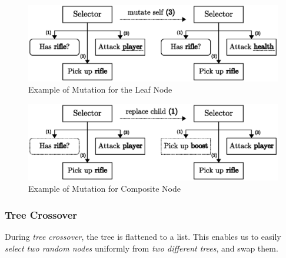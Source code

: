 \documentclass[a4paper, twocolumn]{article}
\begin{document}
        \begin{figure}[H]
            \centering
            \includegraphics[width=\linewidth]{share/leaf_mutation.eps}
            \caption{Example of Mutation for the Leaf Node}
            \label{fig:leaf_mutation}
        \end{figure}

        \begin{figure}[H]
            \centering
            \includegraphics[width=\linewidth]{share/child_replacement.eps}
            \caption{Example of Mutation for Composite Node}
            \label{fig:child_replacement}
        \end{figure}

        \subsubsection*{Tree Crossover}

        During \emph{tree crossover}, the tree is flattened to a list. This enables us to easily \emph{select two random nodes} uniformly from \emph{two different trees}, and swap them.
\end{document}
